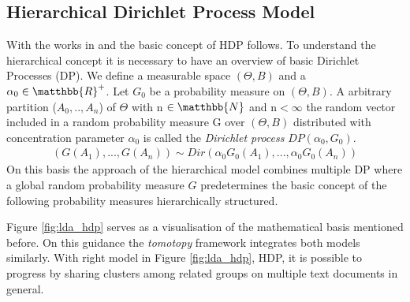 \subsection{Hierarchical Dirichlet Process Model}
With the works in \citet{newman2009distributed} and \citet{teh2006hierarchical,teh2004sharing} the basic concept of HDP follows. To understand the hierarchical concept it is necessary to have an overview of basic Dirichlet Processes (DP). We define a measurable space $(\Theta, B)$ and a $\alpha_0 \in \matthbb{R}^+$. Let $G_0$ be a probability measure on $(\Theta, B)$. A arbitrary partition ($A_0,..,A_n$) of $\Theta$ with n $\in \matthbb{N}$ and n$<\infty$ the random vector included in a random probability measure G over $(\Theta, B)$ distributed with concentration parameter $\alpha_0$ is called the \textit{Dirichlet process} $DP(\alpha_0,G_0)$.
\begin{align}
    (G(A_1),...,G(A_n)) \sim Dir(\alpha_0G_0(A_1),...,\alpha_0G_0(A_n))
\end{align}
On this basis the approach of the hierarchical model combines multiple DP where a global random probability measure $G$ predetermines the basic concept of the following probability measures hierarchically structured.

Figure \ref{fig:lda_hdp} serves as a visualisation of the mathematical basis mentioned before. On this guidance the \textit{tomotopy} framework integrates both models similarly.
With right model in Figure \ref{fig:lda_hdp}, HDP, it is possible to progress by sharing clusters among related groups on multiple text documents in general.


